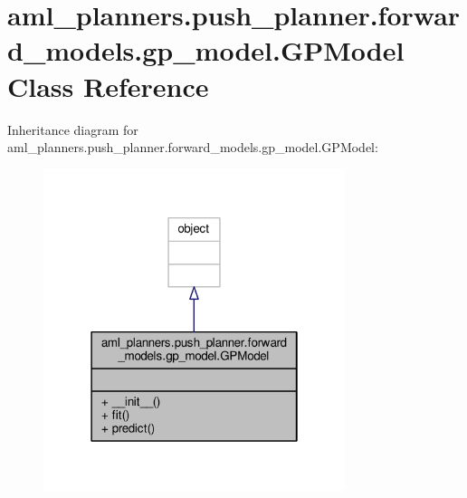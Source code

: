 \hypertarget{classaml__planners_1_1push__planner_1_1forward__models_1_1gp__model_1_1_g_p_model}{\section{aml\-\_\-planners.\-push\-\_\-planner.\-forward\-\_\-models.\-gp\-\_\-model.\-G\-P\-Model Class Reference}
\label{classaml__planners_1_1push__planner_1_1forward__models_1_1gp__model_1_1_g_p_model}
}


Inheritance diagram for aml\-\_\-planners.\-push\-\_\-planner.\-forward\-\_\-models.\-gp\-\_\-model.\-G\-P\-Model\-:
\nopagebreak
\begin{figure}[H]
\begin{center}
\leavevmode
\includegraphics[width=250pt]{classaml__planners_1_1push__planner_1_1forward__models_1_1gp__model_1_1_g_p_model__inherit__graph}
\end{center}
\end{figure}


